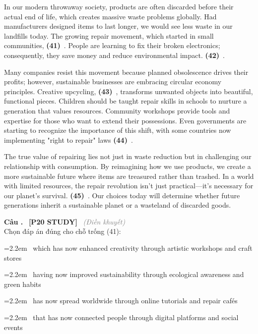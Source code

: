 \documentclass[12pt,a4paper,twoside]{article}
\newcounter{qcounter}
\newcommand{\question}[2][]{%
    \stepcounter{qcounter}%
    \par\vspace{6pt}%
    \noindent\textcolor{primaryBlue}{\textbf{Câu \theqcounter.}}~%
    \textcolor{secondaryBlue}{\small\textbf{[P20 STUDY]}}~%
    \if\relax\detokenize{#1}\relax\else\textcolor{gray}{\small\textit{(#1)}}~\fi\\[1pt]
    \noindent #2%
}
\newcommand{\choiceitem}[2]{%
    \tikz[baseline=-0.5ex]{%
        \node[draw=primaryBlue, circle, minimum size=1.5em, inner sep=0pt, thick] {\textbf{#1}};%
    }~#2%
}
\newenvironment{readingpassage}[1][]{%
    \begin{tcolorbox}[enhanced, colback=grayLight, colframe=secondaryBlue,
        coltitle=textDark, fonttitle=\bfseries, title={#1},
        rounded corners, arc=3mm, boxrule=1pt,
        left=15pt, right=15pt, top=10pt, bottom=10pt,
        breakable, before skip=10pt, after skip=10pt, drop fuzzy shadow]
    \setstretch{1.3}
}{\end{tcolorbox}}
\begin{document}
\begin{readingpassage}[]
In our modern throwaway society, products are often discarded before their actual end of life, which creates massive waste problems globally. Had manufacturers designed items to last longer, we would see less waste in our landfills today. The growing repair movement, which started in small communities, \textbf{(41)}~\underline{\hspace{1.3cm}}. People are learning to fix their broken electronics; consequently, they save money and reduce environmental impact. \textbf{(42)}~\underline{\hspace{1.3cm}}.

Many companies resist this movement because planned obsolescence drives their profits; however, sustainable businesses are embracing circular economy principles. Creative upcycling, \textbf{(43)}~\underline{\hspace{1.3cm}}, transforms unwanted objects into beautiful, functional pieces. Children should be taught repair skills in schools to nurture a generation that values resources. Community workshops provide tools and expertise for those who want to extend their possessions. Even governments are starting to recognize the importance of this shift, with some countries now implementing "right to repair" laws \textbf{(44)}~\underline{\hspace{1.3cm}}.

The true value of repairing lies not just in waste reduction but in challenging our relationship with consumption. By reimagining how we use products, we create a more sustainable future where items are treasured rather than trashed. In a world with limited resources, the repair revolution isn't just practical—it's necessary for our planet's survival. \textbf{(45)}~\underline{\hspace{1.3cm}}. Our choices today will determine whether future generations inherit a sustainable planet or a wasteland of discarded goods.
\end{readingpassage}

\question[Điền khuyết]{Chọn đáp án đúng cho chỗ trống (41):}

\par\vspace{4pt}
\noindent\hangindent=2.2em\choiceitem{A}{which has now enhanced creativity through artistic workshops and craft stores}\par\vspace{4pt}
\noindent\hangindent=2.2em\choiceitem{B}{having now improved sustainability through ecological awareness and green habits}\par\vspace{4pt}
\noindent\hangindent=2.2em\choiceitem{C}{has now spread worldwide through online tutorials and repair cafés}\par\vspace{4pt}
\noindent\hangindent=2.2em\choiceitem{D}{that has now connected people through digital platforms and social events}\par\vspace{4pt}
\end{document}
